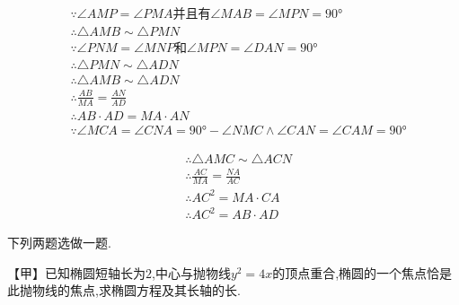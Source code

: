 \begin{questions}
	\begin{solution}
		\begin{align*}
			 & \because \angle{AMP} = \angle{PMA} \text{并且有} \angle{MAB} = \angle{MPN} = \ang{90}                     \\
			 & \therefore \triangle{AMB} \sim \triangle{PMN}                                                          \\
			 & \because \angle{PNM} = \angle{MNP} \text{和} \angle{MPN} = \angle{DAN} = \ang{90}                       \\
			 & \therefore \triangle{PMN} \sim \triangle{ADN}                                                          \\
			 & \therefore \triangle{AMB} \sim \triangle{ADN}                                                          \\
			 & \therefore \frac{AB}{MA} = \frac{AN}{AD}                                                               \\
			 & \therefore AB\cdot AD = MA \cdot AN                                                                    \\
			 & \because \angle{MCA} = \angle{CNA} = \ang{90} - \angle{NMC} \land \angle{CAN} = \angle{CAM} = \ang{90}
		\end{align*}

		\begin{align*}
			 & \therefore \triangle{AMC} \sim \triangle{ACN} \\
			 & \therefore \frac{AC}{MA} = \frac{NA}{AC}      \\
			 & \therefore AC^2 = MA \cdot CA                 \\
			 & \therefore AC^2 = AB \cdot AD
		\end{align*}
	\end{solution}
	\question[10] 下列两题选做一题.

	【甲】已知椭圆短轴长为$2$,中心与抛物线$y^2=4x$的顶点重合,椭圆的一个焦点恰是此抛物线的焦点,求椭圆方程及其长轴的长.
	\begin{solution}
		\begin{center}
		\end{center}


\end{solution}
\end{questions}
